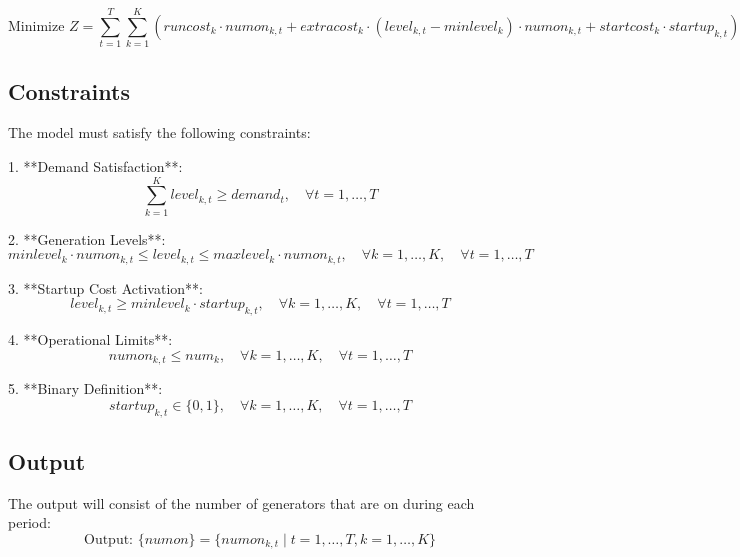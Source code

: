 \documentclass{article}
\begin{document}
\[
\text{Minimize } Z = \sum_{t=1}^{T} \sum_{k=1}^{K} \left( runcost_k \cdot numon_{k,t} + extracost_k \cdot (level_{k,t} - minlevel_k) \cdot numon_{k,t} + startcost_k \cdot startup_{k,t} \right)
\]

\subsection*{Constraints}
The model must satisfy the following constraints:

1. **Demand Satisfaction**:
\[
\sum_{k=1}^{K} level_{k,t} \geq demand_t, \quad \forall t = 1, \ldots, T
\]

2. **Generation Levels**:
\[
minlevel_k \cdot numon_{k,t} \leq level_{k,t} \leq maxlevel_k \cdot numon_{k,t}, \quad \forall k = 1, \ldots, K, \quad \forall t = 1, \ldots, T
\]

3. **Startup Cost Activation**:
\[
level_{k,t} \geq minlevel_k \cdot startup_{k,t}, \quad \forall k = 1, \ldots, K, \quad \forall t = 1, \ldots, T
\]

4. **Operational Limits**:
\[
numon_{k,t} \leq num_k, \quad \forall k = 1, \ldots, K, \quad \forall t = 1, \ldots, T
\]

5. **Binary Definition**:
\[
startup_{k,t} \in \{0, 1\}, \quad \forall k = 1, \ldots, K, \quad \forall t = 1, \ldots, T
\]

\subsection*{Output}
The output will consist of the number of generators that are on during each period:
\[
\text{Output: } \{ numon \} = \{ numon_{k,t} \mid t = 1, \ldots, T, k = 1, \ldots, K \}
\]
\end{document}
